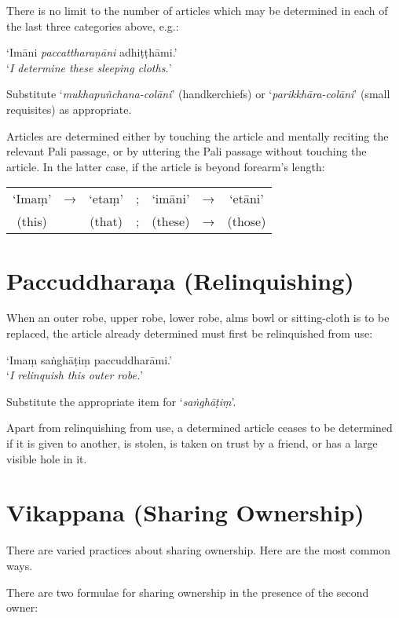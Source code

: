 There is no limit to the number of articles which may be determined in each of
the last three categories above, e.g.:

‘Imāni \emph{paccattharaṇāni} adhiṭṭhāmi.’\\
‘\emph{I determine these sleeping cloths.}’

Substitute ‘\emph{mukhapuñchana-colāni}’ (handkerchiefs) or
‘\emph{parikkhāra-colāni}’ (small requisites) as appropriate.

Articles are determined either by touching the article and mentally reciting the
relevant Pali passage, or by uttering the Pali passage without touching the
article. In the latter case, if the article is beyond forearm's length:

\begin{tabular}{c c c c c c c}
‘Imaṃ’ & → & ‘etaṃ’ & ; & ‘imāni’ & → & ‘etāni’\\
(this) &   & (that) & ; & (these) & → & (those)\\
\end{tabular}

\section{Paccuddharaṇa (Relinquishing)}

When an outer robe, upper robe, lower robe, alms bowl or sitting-cloth is to be
replaced, the article already determined must first be relinquished from use:

‘Imaṃ saṅghāṭiṃ paccuddharāmi.’\\
‘\emph{I relinquish this outer robe.}’ 

Substitute the appropriate item for ‘\emph{saṅghāṭiṃ}’.

Apart from relinquishing from use, a determined article ceases to be determined
if it is given to another, is stolen, is taken on trust by a friend, or has a
large visible hole in it.

\section{Vikappana (Sharing Ownership)}

There are varied practices about sharing ownership. Here are the most common
ways.


There are two formulae for sharing ownership in the presence of the second
owner:

